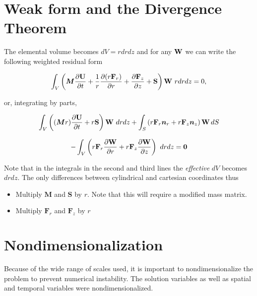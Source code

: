 \documentclass[12pt, a4paper]{report}
\begin{document}
\section{Weak form and the Divergence Theorem}
The elemental volume becomes $dV = r dr dz$ and for any ${\bf W}$ we can write the following weighted residual form



\begin{center}
\[\begin{array}{c} \displaystyle
\int_V \left({\bm M} \frac{\partial {\bf U}}{\partial t} +  \frac{1}{r} \frac{\partial (r {\bf F}_r)}{\partial r}  + \frac{\partial {\bf F}_z}{\partial z} +   {\bf S}\right) {\bf W} \ r dr dz  = 0 ,
\end{array} \]
\end{center}
or, integrating by parts, 
\begin{center}
\[\begin{array}{c}
\displaystyle \int_V \left(({\bm M} r) \frac{\partial {\bf U}}{\partial t}   +r{\bf S}\right) {\bf W} \ dr  dz  
\displaystyle + \int_S\left(  r {\bf F}_r {\bm n}_r +  r {\bf F}_z {\bm n}_z \right) {\bf W}  \, dS \\[4ex] - \displaystyle \int_V \left(  r {\bf F}_r\frac{\partial {\bf W}}{\partial r}  + r {\bf F}_z\frac{\partial {\bf W}}{\partial z} \right) \ dr  dz  = {\bf 0}
\end{array}
\]
\end{center}

Note that in the integrals in the second and third lines the {\em effective} $dV$ becomes $dr dz$. The only differences between cylindrical and cartesian coordinates thus

\begin{itemize}
\item Multiply $\bm M$ and $\bm S$ by $r$. Note that this will require a modified mass matrix.
\item Multiply ${\bm F}_r$ and ${\bm F}_z$ by $r$

\end{itemize}

\section{Nondimensionalization}
\noindent
Because of the wide range of scales used, it is important to nondimensionalize the problem to prevent numerical instability. The solution variables as well as spatial and temporal variables were nondimensionalized.
\end{document}
